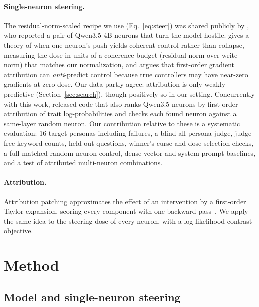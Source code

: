 \documentclass[11pt]{article}
\begin{document}
\paragraph{Single-neuron steering.} The residual-norm-scaled recipe we use (Eq.~\ref{eq:steer}) was shared publicly by \citet{lyra2026steer}, who reported a pair of Qwen3.5-4B neurons that turn the model hostile. \citet{liu2026leverage} gives a theory of when one neuron's push yields coherent control rather than collapse, measuring the dose in units of a coherence budget (residual norm over write norm) that matches our normalization, and argues that first-order gradient attribution can \emph{anti}-predict control because true controllers may have near-zero gradients at zero dose. Our data partly agree: attribution is only weakly predictive (Section~\ref{sec:search}), though positively so in our setting. Concurrently with this work, \citet{howell2026neuron} released code that also ranks Qwen3.5 neurons by first-order attribution of trait log-probabilities and checks each found neuron against a same-layer random neuron. Our contribution relative to these is a systematic evaluation: 16 target personas including failures, a blind all-persona judge, judge-free keyword counts, held-out questions, winner's-curse and dose-selection checks, a full matched random-neuron control, dense-vector and system-prompt baselines, and a test of attributed multi-neuron combinations.

\paragraph{Attribution.} Attribution patching approximates the effect of an intervention by a first-order Taylor expansion, scoring every component with one backward pass~\citep{nanda2023attribution,syed2023attribution,kramar2024atp}. We apply the same idea to the steering dose of every neuron, with a log-likelihood-contrast objective.

\section{Method}
\label{sec:method}

\subsection{Model and single-neuron steering}
\end{document}
